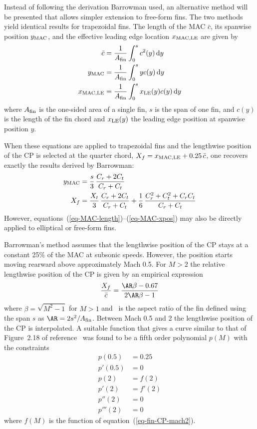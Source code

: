 Instead of following the derivation Barrowman used, an alternative
method will be presented that allows simpler extension to free-form
fins.  The two methods yield identical results for trapezoidal fins.
The length of the MAC $\bar c$, its spanwise position $y_{\rm MAC}$,
and the effective leading edge location $x_{\rm MAC,LE}$ are given
by~\cite{appl-comp-aero-fins}
%
\begin{align}
\bar c &=  \frac{1}{\Afin} \int_0^s c^2(y) \dif y
   \label{eq-MAC-length} \\
y_{\rm MAC} &= \frac{1}{\Afin} \int_0^s yc(y) \dif y 
   \label{eq-MAC-ypos} \\
x_{\rm MAC,LE} &= \frac{1}{\Afin} \int_0^s x_{\rm LE}(y)c(y) \dif y
   \label{eq-MAC-xpos}
\end{align}
%
where $A_{\rm fin}$ is the one-sided area of a single fin, $s$ is the span of
one fin, and $c(y)$ is the length of the fin chord and $x_{\rm LE}(y)$
the leading edge position at spanwise position $y$.

When these equations are applied to trapezoidal fins and the
lengthwise position of the CP is selected at the quarter chord,
$X_f=x_{\rm MAC,LE}+0.25\,\bar c$,
one recovers exactly the results derived by Barrowman:
%
\begin{align}
y_{\rm MAC} &= \frac{s}{3}\,\frac{C_r+2C_t}{C_r+C_t} \\
X_f &= \frac{X_t}{3}\,\frac{C_r+2C_t}{C_r+C_t} +
          \frac{1}{6}\,\frac{C_r^2+C_t^2+C_rC_t}{C_r+C_t}
\end{align}
%
However, equations~(\ref{eq-MAC-length})--(\ref{eq-MAC-xpos}) may also
be directly applied to elliptical or free-form fins.

Barrowman's method assumes that the lengthwise position of the CP
stays at a constant 25\% of the MAC at subsonic speeds.  However, the
position starts moving rearward above approximately Mach 0.5.  For
$M>2$ the relative lengthwise position of the CP is given by an empirical
expression~\cite[p.~33]{fleeman}
%
\begin{equation}
\frac{X_f}{\bar c} = \frac{\AR\beta - 0.67}{2\AR\beta-1}
\label{eq-fin-CP-mach2}
\end{equation}
%
where $\beta=\sqrt{M^2-1}$ for $M>1$ and \AR\ is the aspect ratio of
the fin defined using the span $s$ as $\AR=2s^2/\Afin$. 
%
Between Mach 0.5 and 2 the lengthwise position of the CP is
interpolated.  A suitable function that gives a curve similar to that
of Figure~2.18 of reference~\cite[p.~33]{fleeman} was found to be a
fifth order polynomial $p(M)$ with the constraints
%
\begin{equation}
  \begin{split}
p(0.5)   & =  0.25 \\
p'(0.5)  & =  0 \\
p(2)     & =  f(2)  \\
p'(2)    & =  f'(2) \\
p''(2)   & =  0 \\
p'''(2)  & =  0
  \end{split}
\end{equation}
%
where $f(M)$ is the function of equation~(\ref{eq-fin-CP-mach2}).



